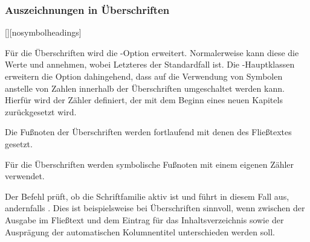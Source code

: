 \subsubsection{Auszeichnungen in Überschriften}
\begin{Declaration}[v2.02]{[\PSet]}[nosymbolheadings]%
\begin{Declaration}[v2.02]{}%
\printdeclarationlist%
%
%
Für die Überschriften wird die \KOMAScript-Option  erweitert.
Normalerweise kann diese die Werte  und  
annehmen, wobei Letzteres der Standardfall ist. Die \TUDScript-Hauptklassen 
erweitern die Option dahingehend, dass auf die Verwendung von Symbolen anstelle 
von Zahlen innerhalb der Überschriften umgeschaltet werden kann. Hierfür wird 
der Zähler  definiert, der mit dem Beginn eines neuen 
Kapitels zurückgesetzt wird.
%
\begin{values}
\item[nosymbolheadings/numberheadings]
  Die Fußnoten der Überschriften werden fortlaufend mit denen des Fließtextes 
  gesetzt.
\item[symbolheadings]
  Für die Überschriften werden symbolische Fußnoten mit einem eigenen Zähler 
  verwendet.
\end{values}
\end{Declaration}
\end{Declaration}

\begin{Declaration}{}%
\printdeclarationlist%
%
%
Der Befehl  prüft, ob die Schriftfamilie \DIN aktiv ist und führt 
in diesem Fall  aus, andernfalls . 
Dies ist beispielsweise bei Überschriften sinnvoll, wenn zwischen der Ausgabe 
im Fließtext und dem Eintrag für das Inhaltsverzeichnis sowie der Ausprägung 
der automatischen Kolumnentitel unterschieden werden soll.
\end{Declaration}

